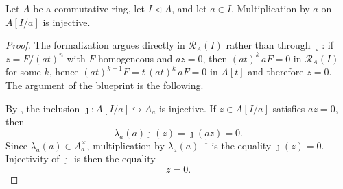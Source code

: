 \begin{lemma}
  \label{lemma:nagata-chart-generator-regular}
  \leanok

  Let $A$ be a commutative ring, let $I\triangleleft A$, and let $a\in I$.
  Multiplication by $a$ on $A[I/a]$ is injective.
\end{lemma}

\begin{proof}
  \leanok
  The formalization argues directly in $\mathcal R_A(I)$ rather than through
  $\jmath$: if $z=F/(at)^n$ with $F$ homogeneous and $az=0$, then
  $(at)^k\,aF=0$ in $\mathcal R_A(I)$ for some $k$, hence
  $(at)^{k+1}F=t\,(at)^k\,aF=0$ in $A[t]$ and therefore $z=0$.  The argument of
  the blueprint is the following.

  By , the inclusion
  $\jmath\colon A[I/a]\hookrightarrow A_a$ is injective.  If
  $z\in A[I/a]$ satisfies $az=0$, then
  \[
    \lambda_a(a)\jmath(z)=\jmath(az)=0.
  \]
  Since $\lambda_a(a)\in A_a^\times$, multiplication by
  $\lambda_a(a)^{-1}$ is the equality $\jmath(z)=0$.  Injectivity of
  $\jmath$ is then the equality
  \[
    z=0.
  \]
\end{proof}

